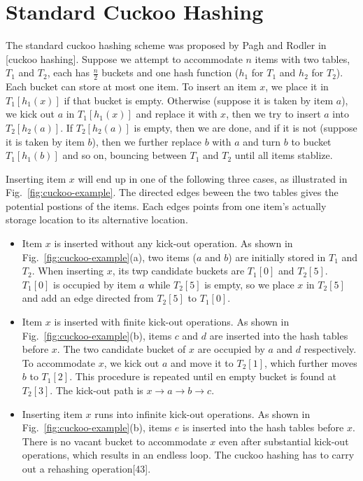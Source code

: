 \documentclass[runningheads]{llncs}
\begin{document}
\section{Standard Cuckoo Hashing}
\label{sec:cuckoo}
The standard cuckoo hashing scheme was proposed by Pagh and Rodler in [cuckoo hashing]. Suppose we attempt to accommodate $n$ items with two tables, $T_1$ and $T_2$, each has $\frac{n}{2}$ buckets and one hash function ($h_1$ for $T_1$ and $h_2$ for $T_2$). Each bucket can store at most one item. To insert an item $x$, we place it in $T_1[h_1(x)]$ if that bucket is empty. Otherwise (suppose it is taken by item $a$), we kick out $a$ in $T_1[h_1(x)]$ and replace it with $x$, then we try to insert $a$ into $T_2[h_2(a)]$. If $T_2[h_2(a)]$ is empty, then we are done, and if it is not (suppose it is taken by item $b$), then we further replace $b$ with $a$ and turn $b$ to bucket $T_1[h_1(b)]$ and so on, bouncing between $T_1$ and $T_2$ until all items stablize.

Inserting item $x$ will end up in one of the following three cases, as illustrated in Fig.~\ref{fig:cuckoo-example}. The directed edges beween the two tables gives the potential postions of the items. Each edges points from one item's actually storage location to its alternative location.

\begin{itemize}
    \item Item $x$ is inserted without any kick-out operation. As shown in Fig.~\ref{fig:cuckoo-example}(a), two items ($a$ and $b$) are initially stored in $T_1$ and $T_2$. When inserting $x$, its twp candidate buckets are $T_1[0]$ and $T_2[5]$. $T_1[0]$ is occupied by item $a$ while $T_2[5]$ is empty, so we place $x$ in $T_2[5]$ and add an edge directed from $T_2[5]$ to $T_1[0]$.
    \item Item $x$ is inserted with finite kick-out operations. As shown in Fig.~\ref{fig:cuckoo-example}(b), items $c$ and $d$ are inserted into the hash tables before $x$. The two candidate bucket of $x$ are occupied by $a$ and $d$ respectively. To accommodate $x$, we kick out $a$ and move it to $T_2[1]$, which further moves $b$ to $T_1[2]$. This procedure is repeated until en empty bucket is found at $T_2[3]$. The kick-out path is $x\rightarrow a\rightarrow b\rightarrow c$.
    \item Inserting item $x$ runs into infinite kick-out operations. As shown in Fig.~\ref{fig:cuckoo-example}(b), items $e$ is inserted into the hash tables before $x$. There is no vacant bucket to accommodate $x$ even after substantial kick-out operations, which results in an endless loop. The cuckoo hashing has to carry out a rehashing operation[43].
\end{itemize}
\end{document}
